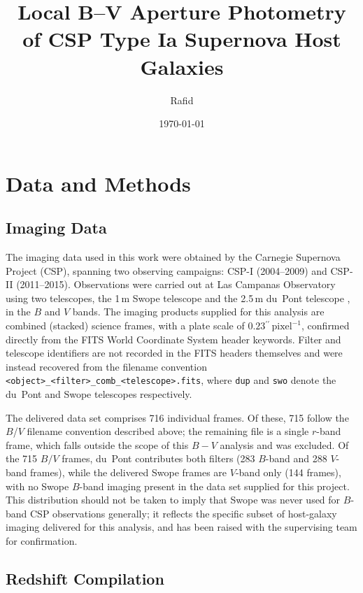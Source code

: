 \documentclass[12pt]{article}
\title{Local B--V Aperture Photometry of CSP Type Ia Supernova Host Galaxies}
\author{Rafid}
\date{\today}
\newcommand{\arcsec}{\ensuremath{^{\prime\prime}}}
\begin{document}
\maketitle

\section{Data and Methods}

\subsection{Imaging Data}
\label{sec:imaging_data}

The imaging data used in this work were obtained by the Carnegie Supernova Project (CSP), spanning two observing campaigns: CSP-I (2004--2009) and CSP-II (2011--2015). Observations were carried out at Las Campanas Observatory using two telescopes, the 1\,m Swope telescope and the 2.5\,m du~Pont telescope \citep{Hamuy2006}, in the $B$ and $V$ bands. The imaging products supplied for this analysis are combined (stacked) science frames, with a plate scale of $0.23\arcsec\,\mathrm{pixel}^{-1}$, confirmed directly from the FITS World Coordinate System header keywords. Filter and telescope identifiers are not recorded in the FITS headers themselves and were instead recovered from the filename convention \texttt{<object>\_<filter>\_comb\_<telescope>.fits}, where \texttt{dup} and \texttt{swo} denote the du~Pont and Swope telescopes respectively.

The delivered data set comprises 716 individual frames. Of these, 715 follow the $B$/$V$ filename convention described above; the remaining file is a single $r$-band frame, which falls outside the scope of this $B-V$ analysis and was excluded. Of the 715 $B/V$ frames, du~Pont contributes both filters (283 $B$-band and 288 $V$-band frames), while the delivered Swope frames are $V$-band only (144 frames), with no Swope $B$-band imaging present in the data set supplied for this project. This distribution should not be taken to imply that Swope was never used for $B$-band CSP observations generally; it reflects the specific subset of host-galaxy imaging delivered for this analysis, and has been raised with the supervising team for confirmation.

\subsection{Redshift Compilation}
\label{sec:redshift_compilation}
\end{document}
